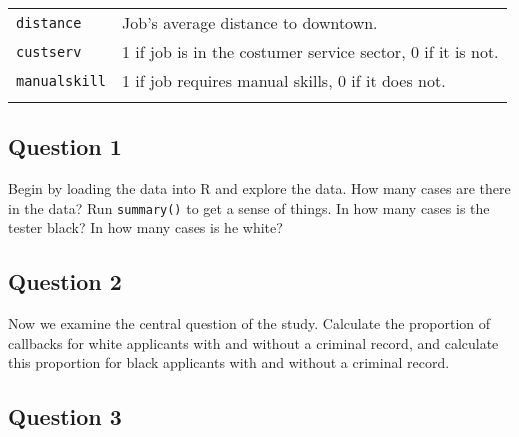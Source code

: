 \documentclass[]{article}
\begin{document}
\begin{longtable}[c]{@{}ll@{}}
\\\addlinespace
\begin{minipage}[t]{0.29\columnwidth}\raggedright
\texttt{distance}
\end{minipage} & \begin{minipage}[t]{0.65\columnwidth}\raggedright
Job's average distance to downtown.
\end{minipage}
\\\addlinespace
\begin{minipage}[t]{0.29\columnwidth}\raggedright
\texttt{custserv}
\end{minipage} & \begin{minipage}[t]{0.65\columnwidth}\raggedright
1 if job is in the costumer service sector, 0 if it is not.
\end{minipage}
\\\addlinespace
\begin{minipage}[t]{0.29\columnwidth}\raggedright
\texttt{manualskill}
\end{minipage} & \begin{minipage}[t]{0.65\columnwidth}\raggedright
1 if job requires manual skills, 0 if it does not.
\end{minipage}
\\\addlinespace
\bottomrule
\end{longtable}

\subsection{Question 1}\label{question-1}

Begin by loading the data into R and explore the data. How many cases
are there in the data? Run \texttt{summary()} to get a sense of things.
In how many cases is the tester black? In how many cases is he white?

\subsection{Question 2}\label{question-2}

Now we examine the central question of the study. Calculate the
proportion of callbacks for white applicants with and without a criminal
record, and calculate this proportion for black applicants with and
without a criminal record.

\subsection{Question 3}\label{question-3}
\end{document}
